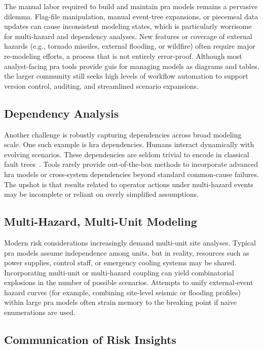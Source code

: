 The manual labor required to build and maintain \acrshort{pra} models remains a pervasive dilemma. Flag-file manipulation, manual event-tree expansions, or piecemeal data updates can cause inconsistent modeling states, which is particularly worrisome for multi-hazard and dependency analyses. New features or coverage of external hazards (e.g., tornado missiles, external flooding, or wildfire) often require major re‐modeling efforts, a process that is not entirely error-proof. Although most analyst-facing \acrshort{pra} tools provide \acrshort{gui}s for managing models as diagrams and tables, the larger community still seeks high levels of workflow automation to support version control, auditing, and streamlined scenario expansions.

\subsection*{Dependency Analysis}

Another challenge is robustly capturing dependencies across broad modeling scale. One such example is \acrfull{hra} dependencies. Humans interact dynamically with evolving scenarios. These dependencies are seldom trivial to encode in classical fault trees~\cite{diaconeasa_ads-idac_2017, diaconeasa_branching_2018}. Tools rarely provide out‐of‐the‐box methods to incorporate advanced \acrshort{hra} models or cross‐system dependencies beyond standard common-cause failures. The upshot is that results related to operator actions under multi-hazard events may be incomplete or reliant on overly simplified assumptions.

\subsection*{Multi-Hazard, Multi-Unit Modeling}

Modern risk considerations increasingly demand multi-unit site analyses. Typical \acrshort{pra} models assume independence among units, but in reality, resources such as power supplies, control staff, or emergency cooling systems may be shared. Incorporating multi-unit or multi-hazard coupling can yield combinatorial explosions in the number of possible scenarios. Attempts to unify external-event hazard curves (for example, combining site-level seismic or flooding profiles) within large \acrshort{pra} models often strain memory to the breaking point if naive enumerations are used.

\subsection*{Communication of Risk Insights}

